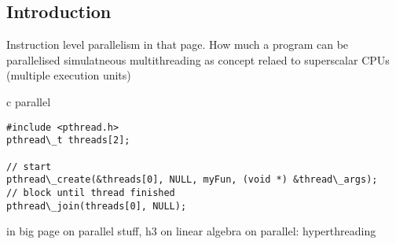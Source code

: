 
\subsection{Introduction}

Instruction level parallelism in that page. How much a program can be parallelised
simulatneous multithreading as concept relaed to superscalar CPUs (multiple execution units)

c parallel

\begin{verbatim}
#include <pthread.h>
pthread\_t threads[2];

// start
pthread\_create(&threads[0], NULL, myFun, (void *) &thread\_args);
// block until thread finished
pthread\_join(threads[0], NULL);
\end{verbatim}


in big page on parallel stuff, h3 on linear algebra
on parallel: hyperthreading



